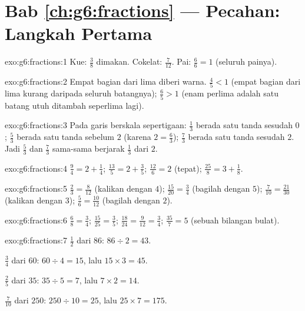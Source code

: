 \section*{Bab \ref{ch:g6:fractions} --- Pecahan: Langkah Pertama}

\begin{solution}{exo:g6:fractions:1}
Kue: $\frac38$ dimakan. \quad Cokelat: $\frac{7}{12}$. \quad
Pai: $\frac66 = 1$ (seluruh painya).
\end{solution}

\begin{solution}{exo:g6:fractions:2}
Empat bagian dari lima diberi warna. $\frac45 < 1$ (empat bagian dari
lima kurang daripada seluruh batangnya); $\frac65 > 1$ (enam perlima
adalah satu batang utuh ditambah seperlima lagi).
\end{solution}

\begin{solution}{exo:g6:fractions:3}
Pada garis berskala sepertigaan: $\frac13$ berada satu tanda sesudah
$0$; $\frac53$ berada satu tanda sebelum $2$ (karena $2 = \frac63$);
$\frac73$ berada satu tanda sesudah $2$. Jadi $\frac53$ dan $\frac73$
sama-sama berjarak $\frac13$ dari $2$.
\end{solution}

\begin{solution}{exo:g6:fractions:4}
$\frac94 = 2 + \frac14$; \quad
$\frac{13}{5} = 2 + \frac35$; \quad
$\frac{12}{6} = 2$ (tepat); \quad
$\frac{25}{8} = 3 + \frac18$.
\end{solution}

\begin{solution}{exo:g6:fractions:5}
$\frac23 = \frac{8}{12}$ (kalikan dengan $4$); \quad
$\frac{15}{20} = \frac34$ (bagilah dengan $5$); \quad
$\frac{7}{10} = \frac{21}{30}$ (kalikan dengan $3$); \quad
$\frac56 = \frac{10}{12}$ (bagilah dengan $2$).
\end{solution}

\begin{solution}{exo:g6:fractions:6}
$\frac68 = \frac34$; \quad
$\frac{15}{25} = \frac35$; \quad
$\frac{18}{24} = \frac{9}{12} = \frac34$; \quad
$\frac{35}{7} = 5$ (sebuah bilangan bulat).
\end{solution}

\begin{solution}{exo:g6:fractions:7}
$\frac12$ dari $86$: $86 \div 2 = 43$.

$\frac34$ dari $60$: $60 \div 4 = 15$, lalu $15 \times 3 = 45$.

$\frac25$ dari $35$: $35 \div 5 = 7$, lalu $7 \times 2 = 14$.

$\frac{7}{10}$ dari $250$: $250 \div 10 = 25$, lalu $25 \times 7 = 175$.
\end{solution}


